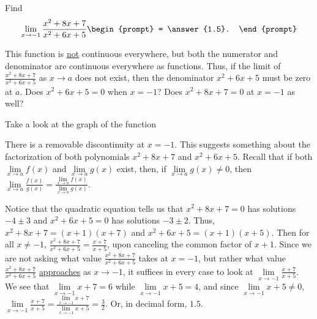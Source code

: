 \documentclass{ximera}
\author{Gregory Hartman \and Matthew Carr}
\begin{document}
\begin{exercise}



  Find 
  \[
  \displaystyle \lim_{x\to-1} \frac{x^2+8x+7}{x^2+6x+5}
  \begin{prompt}
  = \answer{1.5}.
  \end{prompt}
  \]
    \begin{hint}
      This function is \underline{not} continuous everywhere, but both the numerator and denominator are continuous everywhere as functions. Thus, if the limit of $\frac{x^2+8x+7}{x^2+6x+5}$ as $x\to{a}$ does not exist, then the denominator $x^2+6x+5$ must be zero at $a$. Does $x^2+6x+5=0$ when $x=-1$? Does $x^2+8x+7=0$ at $x=-1$ as well?
    \end{hint}
     \begin{hint}
    Take a look at the graph of the function
    \begin{center}
      \end{center}
      There is a removable discontinuity at $x=-1$. This suggests something about the factorization of both polynomials $x^2+8x+7$ and $x^2+6x+5$. Recall that if both $\lim\limits_{x\to a}f(x)$ and $\lim\limits_{x\to a}g(x)$ exist, then, if $\lim\limits_{x\to a}g(x)\ne0$, then $\lim\limits_{x\to a}\frac{f(x)}{g(x)}=\frac{\lim\limits_{x\to a}f(x)}{\lim\limits_{x\to a}g(x)}$.
    \end{hint}
    \begin{hint}
     Notice that the quadratic equation tells us that $x^2+8x+7=0$ has solutions $-4\pm3$ and $x^2+6x+5=0$ has solutions $-3\pm{2}$. Thus, $x^2+8x+7=\left(x+1\right)\left(x+7\right)$ and $x^2+6x+5=\left(x+1\right)\left(x+5\right)$. Then for all $x\ne-1$, $\frac{x^2+8x+7}{x^2+6x+5}=\frac{x+7}{x+5}$, upon canceling the common factor of $x+1$. Since we are not asking what value $\frac{x^2+8x+7}{x^2+6x+5}$ takes at $x=-1$, but rather what value $\frac{x^2+8x+7}{x^2+6x+5}$ \underline{approaches} as $x\to-1$, it suffices in every case to look at $\lim\limits_{x\to-1}\frac{x+7}{x+5}$. We see that $\lim\limits_{x\to-1}x+7=6$ while $\lim\limits_{x\to-1}x+5=4$, and since $\lim\limits_{x\to-1}x+5\ne0$, $\lim\limits_{x\to-1}\frac{x+7}{x+5}=\frac{\lim\limits_{x\to-1}x+7}{\lim\limits_{x\to-1}x+5}=\frac{3}{2}$. Or, in decimal form, $1.5$.
    \end{hint}
\end{exercise}
\end{document}
